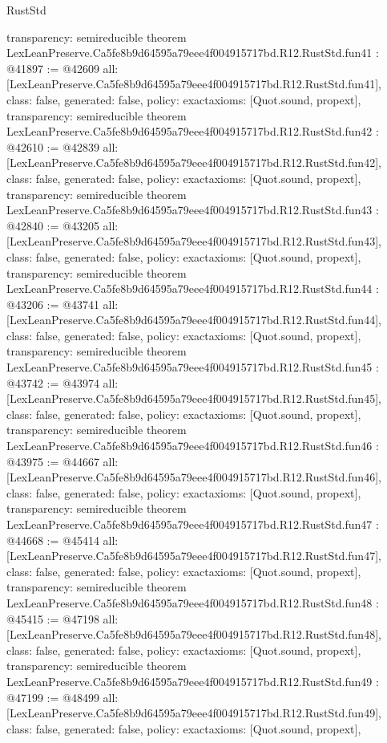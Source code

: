 \begin{lexlean}{RustStd}
\begin{coremodule}
{  transparency: semireducible
}
theorem LexLeanPreserve.Ca5fe8b9d64595a79eee4f004915717bd.R12.RustStd.fun41 : @41897 := @42609 {
  all: [LexLeanPreserve.Ca5fe8b9d64595a79eee4f004915717bd.R12.RustStd.fun41],
  class: false,
  generated: false,
  policy: exact{axioms: [Quot.sound, propext]},
  transparency: semireducible
}
theorem LexLeanPreserve.Ca5fe8b9d64595a79eee4f004915717bd.R12.RustStd.fun42 : @42610 := @42839 {
  all: [LexLeanPreserve.Ca5fe8b9d64595a79eee4f004915717bd.R12.RustStd.fun42],
  class: false,
  generated: false,
  policy: exact{axioms: [Quot.sound, propext]},
  transparency: semireducible
}
theorem LexLeanPreserve.Ca5fe8b9d64595a79eee4f004915717bd.R12.RustStd.fun43 : @42840 := @43205 {
  all: [LexLeanPreserve.Ca5fe8b9d64595a79eee4f004915717bd.R12.RustStd.fun43],
  class: false,
  generated: false,
  policy: exact{axioms: [Quot.sound, propext]},
  transparency: semireducible
}
theorem LexLeanPreserve.Ca5fe8b9d64595a79eee4f004915717bd.R12.RustStd.fun44 : @43206 := @43741 {
  all: [LexLeanPreserve.Ca5fe8b9d64595a79eee4f004915717bd.R12.RustStd.fun44],
  class: false,
  generated: false,
  policy: exact{axioms: [Quot.sound, propext]},
  transparency: semireducible
}
theorem LexLeanPreserve.Ca5fe8b9d64595a79eee4f004915717bd.R12.RustStd.fun45 : @43742 := @43974 {
  all: [LexLeanPreserve.Ca5fe8b9d64595a79eee4f004915717bd.R12.RustStd.fun45],
  class: false,
  generated: false,
  policy: exact{axioms: [Quot.sound, propext]},
  transparency: semireducible
}
theorem LexLeanPreserve.Ca5fe8b9d64595a79eee4f004915717bd.R12.RustStd.fun46 : @43975 := @44667 {
  all: [LexLeanPreserve.Ca5fe8b9d64595a79eee4f004915717bd.R12.RustStd.fun46],
  class: false,
  generated: false,
  policy: exact{axioms: [Quot.sound, propext]},
  transparency: semireducible
}
theorem LexLeanPreserve.Ca5fe8b9d64595a79eee4f004915717bd.R12.RustStd.fun47 : @44668 := @45414 {
  all: [LexLeanPreserve.Ca5fe8b9d64595a79eee4f004915717bd.R12.RustStd.fun47],
  class: false,
  generated: false,
  policy: exact{axioms: [Quot.sound, propext]},
  transparency: semireducible
}
theorem LexLeanPreserve.Ca5fe8b9d64595a79eee4f004915717bd.R12.RustStd.fun48 : @45415 := @47198 {
  all: [LexLeanPreserve.Ca5fe8b9d64595a79eee4f004915717bd.R12.RustStd.fun48],
  class: false,
  generated: false,
  policy: exact{axioms: [Quot.sound, propext]},
  transparency: semireducible
}
theorem LexLeanPreserve.Ca5fe8b9d64595a79eee4f004915717bd.R12.RustStd.fun49 : @47199 := @48499 {
  all: [LexLeanPreserve.Ca5fe8b9d64595a79eee4f004915717bd.R12.RustStd.fun49],
  class: false,
  generated: false,
  policy: exact{axioms: [Quot.sound, propext]},
}
\end{coremodule}
\end{lexlean}
